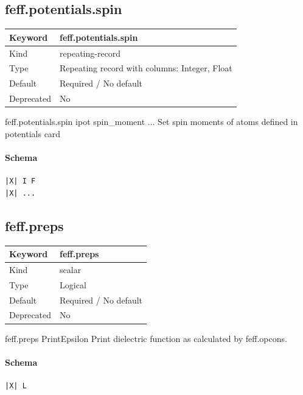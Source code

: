 \documentclass[11pt]{article}
\begin{document}
{{{{\subsection{feff.potentials.spin}
\label{kw:feff-potentials-spin}
\begin{longtable}{|p{1.5in}|p{4.5in}|}
\hline
Keyword & feff.potentials.spin \\
\hline
Kind & repeating-record \\
\hline
Type & Repeating record with columns: Integer, Float \\
\hline
Default & Required / No default \\
\hline
Deprecated & No \\
\hline
\end{longtable}
 feff.potentials.spin{
  ipot spin\_moment
  ...
 }
 Set spin moments of atoms defined in potentials card

\paragraph{Schema}
\begin{Verbatim}
|X| I F
|X| ...
\end{Verbatim}

\subsection{feff.preps}
\label{kw:feff-preps}
\begin{longtable}{|p{1.5in}|p{4.5in}|}
\hline
Keyword & feff.preps \\
\hline
Kind & scalar \\
\hline
Type & Logical \\
\hline
Default & Required / No default \\
\hline
Deprecated & No \\
\hline
\end{longtable}
 feff.preps{ PrintEpsilon }
 Print dielectric function as calculated by feff.opcons.

\paragraph{Schema}
\begin{Verbatim}
|X| L
\end{Verbatim}

}}}}
\end{document}
